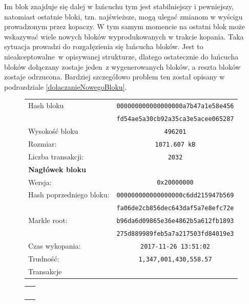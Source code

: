 \documentclass[12pt, twoside, final, openany]{mgr}
\begin{document}
\indent Im blok znajduje się dalej w łańcuchu tym jest stabilniejszy i pewniejszy, natomiast ostatnie bloki, tzn. najświeższe, mogą ulegać zmianom w wyścigu prowadzonym przez kopaczy. W tym samym momencie na ostatni blok może wskazywać wiele nowych bloków wyprodukowanych w trakcie kopania. Taka sytuacja prowadzi do rozgałęzienia się łańcucha bloków. Jest to nieakceptowalne~w opisywanej strukturze, dlatego ostatecznie do łańcucha bloków dołączany zostaje jeden~z wygenerowanych bloków, a reszta bloków zostaje odrzucona. Bardziej szczegółowo problem ten został opisany w podrozdziale \ref{dolaczanieNowegoBloku}.

\begin{figure}[H]
	\begin{center}
  	\begin{tabular}{ | l  c | }
		\hline    
     	Hash bloku & \texttt{000000000000000000a7b47a1e58e456} \\
    			    & \texttt{fd54ae5a30cb92a35ca3e5acee065287} \\ 
    	Wysokość bloku & \texttt{496201} \\ 
    	Rozmiar: & \texttt{1071.607 kB} \\
   	 	Liczba transakcji: & \texttt{2032} \\ \hline
		\textbf{Nagłówek bloku}  &  \\  	 	
   	 	Wersja: & \texttt{0x20000000} \\   	 	
   	 	Hash poprzedniego bloku: &  \texttt{000000000000000000c6dd215947b569} \\
    							 &  \texttt{fa06de2cb856dec643daf5a7e8efc72e} \\ 
		Markle root: 			 & \texttt{b96da6d09865e36e4862b5a612fb1893} \\
								 & \texttt{275d889989feb5a7a217503fd84019e3} \\
   		Czas wykopania: & \texttt{2017-11-26 13:51:02} \\
   		Trudność: & \texttt{1,347,001,430,558.57}\\
   		\hline
   		Transakcje &\\
   		\hline 
 	\end{tabular}
	\end{center}
	
	\begin{center}
	\begin{tabular}{c} 
		\big\Downarrow\
	\end{tabular}
	\end{center}
	

\end{figure}
\end{document}
